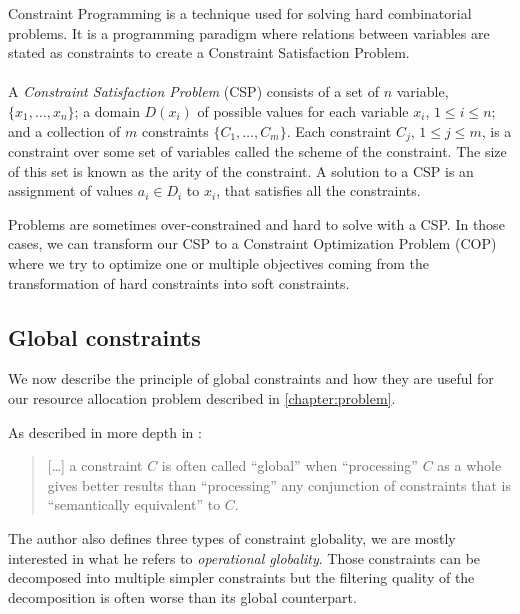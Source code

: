 \documentclass[../../thesis.tex]{subfiles}
\begin{document}
Constraint Programming is a technique used for solving hard combinatorial problems. It is a programming paradigm 
where relations between variables are stated as constraints to create a Constraint Satisfaction Problem.

\paragraph{}

A \emph{Constraint Satisfaction Problem} (CSP) consists of a set of $n$ variable, 
$\{x_1, \dots, x_n \}$; a domain $D(x_i)$ of possible values for each variable $x_i$, 
$1 \leq i \leq n$; and a collection of $m$ constraints $\{ C_1, \dots, C_m \}$. 
Each constraint $C_j$, $1 \leq j \leq m$, is a constraint over some set of variables called the scheme 
of the constraint. The size of this set is known as the arity of the constraint. 
A solution to a CSP is an assignment of values $a_i \in D_i$ to $x_i$, that satisfies all the constraints. \cite{cp-definition}

Problems are sometimes over-constrained and hard to solve with a CSP. In those cases, we can transform our 
CSP to a Constraint Optimization Problem (COP) where we try to optimize one or multiple objectives coming 
from the transformation of hard constraints into soft constraints.

\subsection{Global constraints}


We now describe the principle of global constraints and how they are useful for our resource allocation problem 
described in \autoref{chapter:problem}.

As described in more depth in \cite{Hentenryck:2003}: 

\begin{quotation}
  [\dots] a constraint $C$ is often called “global” when “processing” $C$ as a whole gives better results than “processing” any conjunction
  of constraints that is “semantically equivalent” to $C$.
\end{quotation}

The author also defines three types of constraint globality, we are mostly interested in what he refers to \emph{operational globality}. 
Those constraints can be decomposed into multiple simpler constraints but the filtering quality of the decomposition
is often worse than its global counterpart. 
\end{document}
